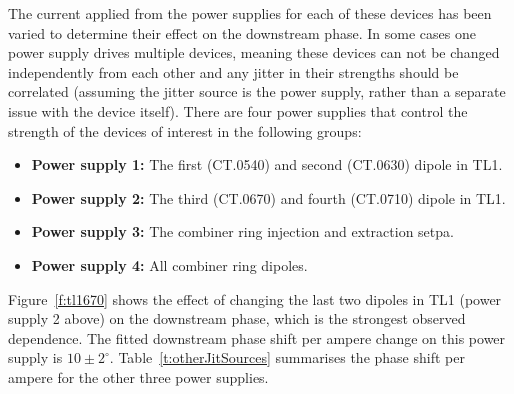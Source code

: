 The current applied from the power supplies for each of these devices has been varied to determine their effect on the downstream phase. In some cases one power supply drives multiple devices, meaning these devices can not be changed independently from each other and any jitter in their strengths should be correlated (assuming the jitter source is the power supply, rather than a separate issue with the device itself). There are four power supplies that control the strength of the devices of interest in the following groups:
\begin{itemize}
\item \textbf{Power supply 1:} The first (CT.0540) and second (CT.0630) dipole in TL1.
\item \textbf{Power supply 2:} The third (CT.0670) and fourth (CT.0710) dipole in TL1.
\item \textbf{Power supply 3:} The combiner ring injection and extraction setpa.
\item \textbf{Power supply 4:} All combiner ring dipoles.
\end{itemize}

Figure~\ref{f:tl1670} shows the effect of changing the last two dipoles in TL1 (power supply 2 above) on the downstream phase, which is the strongest observed dependence. The fitted downstream phase shift per ampere change on this power supply is \(10\pm2^\circ\). Table~\ref{t:otherJitSources} summarises the phase shift per ampere for the other three power supplies. 


